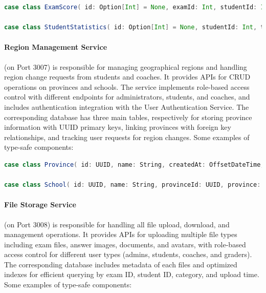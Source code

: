\documentclass[12pt]{article}
\begin{document}
\begin{lstlisting}[language=Scala]
case class ExamScore( id: Option[Int] = None, examId: Int, studentId: Int, totalScore: Double, questionScores: Map[String, Double] = Map.empty, rankPosition: Int = 0, percentile: Double = 0.0, createdAt: Option[LocalDateTime] = None, updatedAt: Option[LocalDateTime] = None )

case class StudentStatistics( id: Option[Int] = None, studentId: Int, totalExams: Int, averageScore: Double, bestScore: Double, worstScore: Double, improvementTrend: Double, strongSubjects: List[String] = List.empty, weakSubjects: List[String] = List.empty, createdAt: Option[LocalDateTime] = None, updatedAt: Option[LocalDateTime] = None )
\end{lstlisting}

\paragraph{Region Management Service} (on Port 3007) is responsible for managing geographical regions and handling region change requests from students and coaches. It provides APIs for CRUD operations on provinces and schools. The service implements role-based access control with different endpoints for administrators, students, and coaches, and includes authentication integration with the User Authentication Service. The corresponding database has three main tables, respectively for storing province information with UUID primary keys, linking provinces with foreign key relationships, and tracking user requests for region changes. Some examples of type-safe components:

\begin{lstlisting}[language=Scala]
case class Province( id: UUID, name: String, createdAt: OffsetDateTime, updatedAt: OffsetDateTime )

case class School( id: UUID, name: String, provinceId: UUID, province: Option[Province] = None, createdAt: OffsetDateTime, updatedAt: OffsetDateTime )
\end{lstlisting}

\paragraph{File Storage Service} (on Port 3008) is responsible for handling all file upload, download, and management operations. It provides APIs for uploading multiple file types including exam files, answer images, documents, and avatars, with role-based access control for different user types (admins, students, coaches, and graders). The corresponding database includes metadata of each files and optimized indexes for efficient querying by exam ID, student ID, category, and upload time. Some examples of type-safe components:
\end{document}
